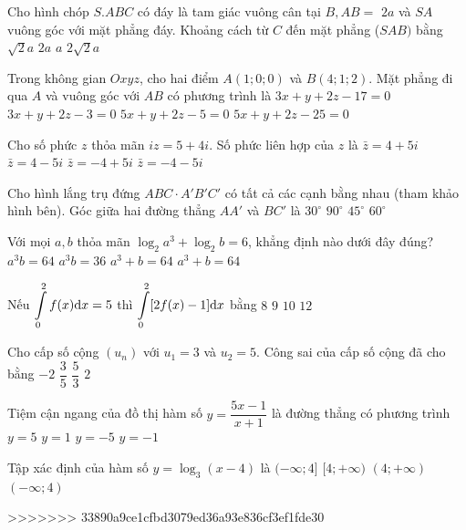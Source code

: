 \begin{ex}%
Cho hình chóp $S.ABC$ có đáy là tam giác vuông cân tại $B, AB=$ $2 a$ và $SA$ vuông góc với mặt phẳng đáy. Khoảng cách từ $C$ đến mặt phẳng ($SAB)$ bằng
\choice
{$\sqrt{2} a$}
{\True $2 a$}
{$a$}
{$2\sqrt{2} a$}

\end{ex}
\begin{ex}%
Trong không gian $O x y z$, cho hai điểm $A(1; 0; 0)$ và $B(4; 1; 2)$. Mặt phẳng đi qua $A$ và vuông góc với $AB$ có phương trình là
\choice
{$3 x+y+2 z-17=0$}
{\True $3 x+y+2 z-3=0$}
{$5 x+y+2 z-5=0$}
{$5 x+y+2 z-25=0$}

\end{ex}
\begin{ex}%
Cho số phức $z$ thỏa mãn $i z=5+4 i$. Số phức liên hợp của $z$ là
\choice
{\True $\bar{z}=4+5 i$}
{$\bar{z}=4-5 i$}
{$\bar{z}=-4+5 i$}
{$\bar{z}=-4-5 i$}

\end{ex}
\begin{ex}%
Cho hình lắng trụ đứng $ABC \cdot A'B'C'$ có tất cả các cạnh bằng nhau (tham khảo hình bên). Góc giữa hai đường thẳng $AA'$ và $BC'$ là
\choice
{$30^{\circ}$}
{$90^{\circ}$}
{\True $45^{\circ}$}
{$60^{\circ}$}

\end{ex}
\begin{ex}%
Với mọi $a, b$ thỏa mãn $\log_2 a^3+\log_2 b=6$, khẳng định nào dưới đây đúng?
\choice
{\True $a^3 b=64$}
{$a^3 b=36$}
{$a^3+b=64$}
{$a^3+b=64$}

\end{ex}
\begin{ex}%
Nếu $\displaystyle\displaystyle\int\limits_0^2 f(x) \mathrm{d} x=5$ thì $\displaystyle\displaystyle\int\limits_0^2[2 f(x)-1] \mathrm{d} x$ bằng
\choice
{\True $8$}
{$9$}
{$10$}
{$12$}

\end{ex}

\begin{ex}%
Cho cấp số cộng $\left(u_n\right)$ với $u_1=3$ và $u_2=5$. Công sai của cấp số cộng đã cho bằng
\choice
{$-2$}
{$\dfrac{3}{5}$}
{$\dfrac{5}{3}$}
{\True $2$}

\end{ex}
\begin{ex}%
Tiệm cận ngang của đồ thị hàm số $y=\dfrac{5 x-1}{x+1}$ là đường thẳng có phương trình
\choice
{\True $y=5$}
{$y=1$}
{$y=-5$}
{$y=-1$}

\end{ex}
\begin{ex}%
Tập xác định của hàm số $y=\log_3(x-4)$ là
\choice
{$(-\infty; 4]$}
{$[4;+\infty)$}
{\True $(4;+\infty)$}
{$(-\infty; 4)$}

\end{ex}

>>>>>>> 33890a9ce1cfbd3079ed36a93e836cf3ef1fde30

